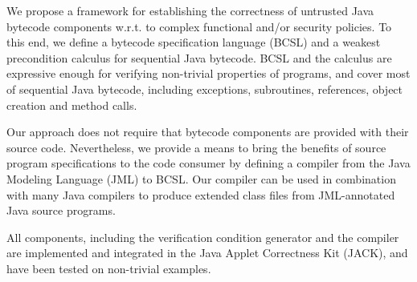 
We propose a framework for establishing the correctness of untrusted
Java bytecode components w.r.t. to complex functional and/or security
policies. To this end, we define a bytecode specification language
(BCSL) and a weakest precondition calculus for sequential Java
bytecode. BCSL and the calculus are expressive enough for verifying
non-trivial properties of programs, and cover most of sequential Java
bytecode, including exceptions, subroutines, references, object
creation and method calls.

Our approach does not require that bytecode components are provided
with their source code. Nevertheless, we provide a means to bring 
the benefits of source program specifications to the code consumer 
by defining a compiler from the Java Modeling Language (JML) to BCSL.
Our compiler can be used in combination with many Java compilers to
produce extended class files from JML-annotated Java source programs.

All components, including the verification condition generator and the
compiler are implemented and integrated in the Java Applet Correctness
Kit (JACK), and have been tested on non-trivial examples.
